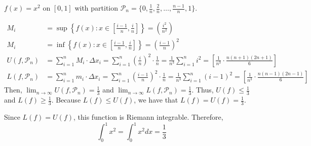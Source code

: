 \begin{example}
    $f(x) = x^2$ on $[0, 1]$ with partition $\mathcal{\mathcal{P}}_n = \{0, \frac{1}{n}, \frac{2}{n}, \ldots, \frac{n - 1}{n}, 1\}$.

    \begin{align*}
        M_i &= \sup \left\{f(x) : x \in \left[\frac{i - 1}{n}, \frac{i}{n}\right]\right\} = \left(\frac{i^2}{n^2}\right) \\
        M_i &= \inf \left\{f(x) : x \in \left[\frac{i - 1}{n}, \frac{i}{n}\right]\right\} = \left(\frac{i - 1}{n}\right)^2 \\
        U(f, \mathcal{\mathcal{P}}_n) &= \sum_{i = 1}^n M_i \cdot \Delta x_i = \sum_{i = 1}^n \left(\frac{i}{n}\right)^2 \cdot \frac{1}{n} = \frac{1}{n^3} \sum_{i = 1}^n i^2 = \left[\frac{1}{n^3} \cdot \frac{n(n + 1)(2n + 1)}{6}\right] \\
        L(f, \mathcal{\mathcal{P}}_n) &= \sum_{i = 1}^n m_i \cdot \Delta x_i = \sum_{i = 1}^n \left(\frac{i - 1}{n}\right)^2 \cdot \frac{1}{n} = \frac{1}{n^3} \sum_{i = 1}^n (i - 1)^2 = \left[\frac{1}{n^3} \cdot \frac{n(n - 1)(2n - 1)}{6}\right]
    \end{align*}
    Then, $\lim_{n \to \infty} U(f, \mathcal{\mathcal{P}}_n) = \frac{1}{3}$ and $\lim_{n \to \infty} L(f, \mathcal{\mathcal{P}}_n) = \frac{1}{3}$. Thus, $U(f) \leq \frac{1}{3}$ and $L(f) \geq \frac{1}{3}$. Because $L(f) \leq U(f)$, we have that $L(f) = U(f) = \frac{1}{3}$.

    Since $L(f) = U(f)$, this function is Riemann integrable. Therefore, $$\int_0^1 x^2 = \int_0^1 x^2dx = \frac{1}{3}$$
\end{example}

